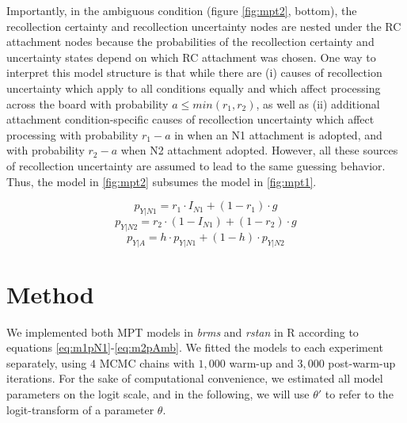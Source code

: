 \documentclass[11pt]{article}\usepackage[]{graphicx}\usepackage[]{color}
\begin{document}
Importantly, in the ambiguous condition (figure \ref{fig:mpt2}, bottom), the recollection certainty and recollection uncertainty nodes are nested under the RC attachment nodes because the probabilities of the recollection certainty and uncertainty states depend on which RC attachment was chosen.
One way to interpret this model structure is that while there are (i) causes of recollection uncertainty which apply to all conditions equally and which affect processing across the board with probability $a \leq min(r_1, r_2)$, as well as (ii) additional attachment condition-specific causes of recollection uncertainty which affect processing with probability $r_1-a$ in when an N1 attachment is adopted, and with probability $r_2-a$ when N2 attachment adopted. However, all these sources of recollection uncertainty are assumed to lead to the same guessing behavior. Thus, the model in \ref{fig:mpt2} subsumes the model in \ref{fig:mpt1}. 

\begin{equation}
p_{Y|N1} = r_1 \cdot I_{ N1 } + (1-r_1) \cdot g
\label{eq:m2pN1}
\end{equation}
\vspace{-0.5cm}
\begin{equation}
p_{Y|N2} = r_2 \cdot (1 - I_{N1}) +  (1-r_2) \cdot g
\label{eq:m2pN2}
\end{equation}
\vspace{-0.5cm}
\begin{equation}
p_{Y|A} =  h  \cdot p_{Y|N1} + (1-h) \cdot p_{Y|N2}
\label{eq:m2pAmb}
\end{equation}


\section{Method}

We implemented both MPT models in \textit{brms} and \textit{rstan} \citep{R-brms, rstan} in R \citep{R-base} according to equations \ref{eq:m1pN1}-\ref{eq:m2pAmb}. We fitted the models to each experiment separately, using $4$ MCMC chains with $1,000$ warm-up and $3,000$ post-warm-up iterations.
For the sake of computational convenience, we estimated all model parameters on the logit scale, and in the following, we will use $\theta'$ to refer to the logit-transform of a parameter $\theta$.
\end{document}
